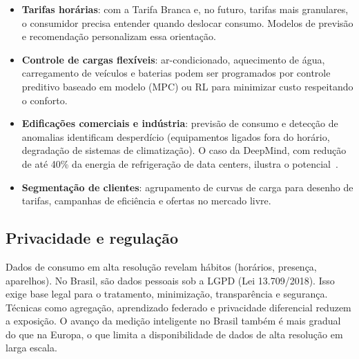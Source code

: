 \documentclass[11pt,a4paper]{article}
\begin{document}
\begin{itemize}
  \item \textbf{Tarifas horárias}: com a Tarifa Branca e, no futuro, tarifas
    mais granulares, o consumidor precisa entender quando deslocar consumo.
    Modelos de previsão e recomendação personalizam essa orientação.
  \item \textbf{Controle de cargas flexíveis}: ar-condicionado, aquecimento de
    água, carregamento de veículos e baterias podem ser programados por
    controle preditivo baseado em modelo (MPC) ou RL para minimizar custo
    respeitando o conforto.
  \item \textbf{Edificações comerciais e indústria}: previsão de consumo e
    detecção de anomalias identificam desperdício (equipamentos ligados fora
    do horário, degradação de sistemas de climatização). O caso da DeepMind,
    com redução de até 40\% da energia de refrigeração de data centers,
    ilustra o potencial~\cite{deepmindcooling}.
  \item \textbf{Segmentação de clientes}: agrupamento de curvas de carga para
    desenho de tarifas, campanhas de eficiência e ofertas no mercado livre.
\end{itemize}

\subsection{Privacidade e regulação}

Dados de consumo em alta resolução revelam hábitos (horários, presença,
aparelhos). No Brasil, são dados pessoais sob a LGPD (Lei 13.709/2018).
Isso exige base legal para o tratamento, minimização, transparência e
segurança. Técnicas como agregação, aprendizado federado e privacidade
diferencial reduzem a exposição. O avanço da medição inteligente no Brasil
também é mais gradual do que na Europa, o que limita a disponibilidade de
dados de alta resolução em larga escala.
\end{document}
